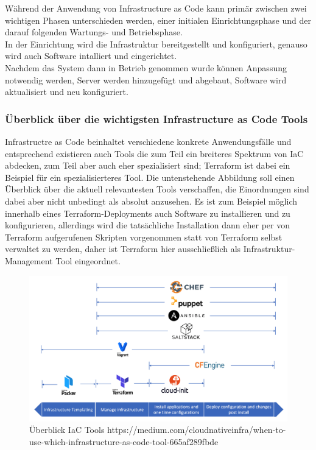 Während der Anwendung von Infrastructure as Code kann primär zwischen zwei
wichtigen Phasen unterschieden werden, einer initialen Einrichtungsphase
und der darauf folgenden Wartungs- und Betriebsphase.\\
In der Einrichtung wird die Infrastruktur bereitgestellt und konfiguriert,
genauso wird auch Software intalliert und eingerichtet.\\
Nachdem das System dann in Betrieb genommen wurde können Anpassung notwendig
werden, Server werden hinzugefügt und abgebaut, Software wird aktualisiert
und neu konfiguriert.

\subsubsection{Überblick über die wichtigsten Infrastructure as Code Tools}

Infrastructre as Code beinhaltet verschiedene konkrete Anwendungsfälle und
entsprechend existieren auch Tools die zum Teil ein breiteres Spektrum
von IaC abdecken, zum Teil aber auch eher spezialisiert sind; Terraform
ist dabei ein Beispiel für ein spezialisierteres Tool. Die untenstehende
Abbildung soll einen Überblick über die aktuell relevantesten Tools
verschaffen, die Einordnungen sind dabei aber nicht unbedingt als absolut
anzusehen. Es ist zum Beispiel möglich innerhalb eines Terraform-Deployments
auch Software zu installieren und zu konfigurieren, allerdings wird die
tatsächliche Installation dann eher per von Terraform aufgerufenen Skripten
vorgenommen statt von Terraform selbst verwaltet zu werden, daher ist
Terraform hier ausschließlich als Infrastruktur-Management Tool eingeordnet.

\begin{figure}[H]
  \includegraphics[width=1.0\textwidth]{fig/hauptteil/IaC_Tools.png}
  \caption{Überblick IaC Tools https://medium.com/cloudnativeinfra/when-to-use-which-infrastructure-as-code-tool-665af289fbde}
  \centering
\end{figure}

